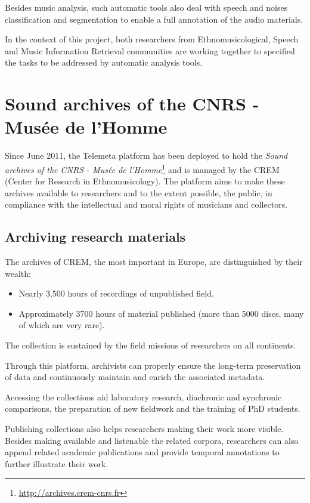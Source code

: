 \documentclass{paper}
\begin{document}
Besides music analysis, such automatic tools also deal with speech and noises classification and segmentation to enable a full annotation of the audio materials.

In the context of this project, both researchers from Ethnomusicological, Speech and Music Information Retrieval communities are working together to specified the tasks to be addressed by automatic analysis tools.

\section{Sound archives of the CNRS - Musée de l'Homme}\label{sec:archives-CREM}
Since June 2011, the Telemeta platform has been deployed to hold the \emph{Sound archives of the CNRS - Musée de l'Homme}\footnote{\url{http://archives.crem-cnrs.fr}} and is managed by the CREM (Center for Research in Ethnomusicology).
The platform aims to make these archives available to researchers and to the extent possible, the public, in compliance with the intellectual and moral rights of musicians and collectors.

\subsection{Archiving research materials}
The archives of CREM, the most important in Europe, are distinguished by their wealth:
\begin{itemize}
\item Nearly 3,500 hours of recordings of unpublished field.
\item Approximately 3700 hours of material published (more than 5000 discs, many of which are very rare).
\end{itemize}
The collection is sustained by the field missions of researchers on all continents. 

Through this platform, archivists can properly ensure the long-term preservation of data and continuously maintain and enrich the associated metadata.

Accessing the collections aid laboratory research, diachronic and synchronic comparisons, the preparation of new fieldwork and the training of PhD students.

Publishing collections also helps researchers making their work more visible. Besides making available and listenable the related corpora, researchers can also append related academic publications and provide temporal annotations to further illustrate their work.
\end{document}
